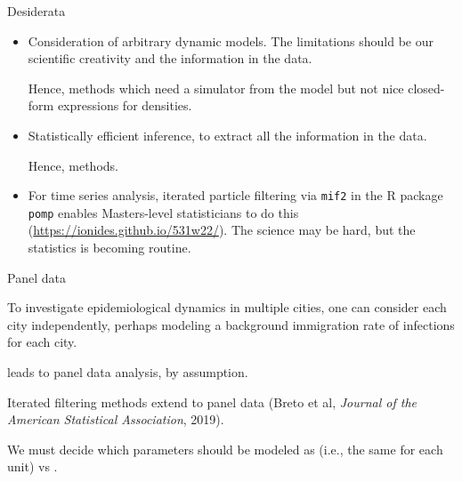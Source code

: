 \documentclass{beamer}
\begin{document}
\begin{frame}{Desiderata}

  \begin{itemize}
    \item Consideration of arbitrary dynamic models. The limitations should be our scientific creativity and the information in the data.

      \vspace{2mm}
      
     Hence,  methods which need a simulator from the model but not nice closed-form expressions for densities.

     \vspace{2mm}
     
    \item Statistically efficient inference, to extract all the information in the data.

      \vspace{2mm}
      
    Hence,  methods.

    \vspace{2mm}
    
      \item  For time series analysis, iterated particle filtering via \texttt{mif2} in the R package \texttt{pomp} enables Masters-level statisticians to do this (\url{https://ionides.github.io/531w22/}). The science may be hard, but the statistics is becoming routine.
      \end{itemize}
  \end{frame}



\begin{frame}{Panel data}

\bi
\item To investigate epidemiological dynamics in multiple cities, one can consider each city independently, perhaps modeling a background immigration rate of infections for each city.

  \vspace{2mm}
  
\item {} leads to panel data analysis, by assumption.

  \vspace{2mm}
  
  \item Iterated filtering methods extend to panel data (Breto et al, {\it Journal of the American Statistical Association}, 2019).

    \vspace{2mm}
    
\item We must decide which parameters should be modeled as  (i.e., the same for each unit) vs .


  \ei

  \end{frame}
\end{document}
